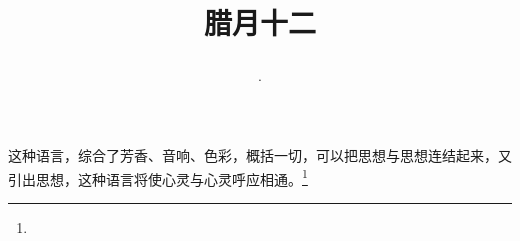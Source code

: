 \title{\date[d=22,m=1,y=2024][year:cn-y,年,month:cn,day:cn,日,·,weekday]·腊月十二 }
这种语言，综合了芳香、音响、色彩，概括一切，可以把思想与思想连结起来，又引出思想，这种语言将使心灵与心灵呼应相通。\footnote{ }

